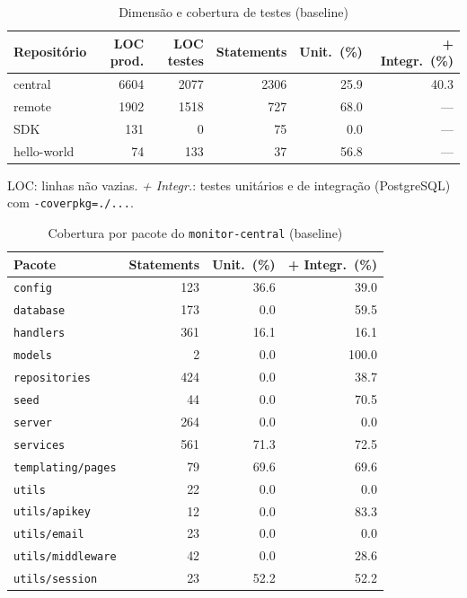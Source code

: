 \begin{table}[htbp]
  \centering\small
  \caption{Dimensão e cobertura de testes (baseline)}
  \label{tab:baseline-cobertura}
  \begin{tabular}{lrrrrr}
    \toprule
    Repositório & LOC prod. & LOC testes & Statements & Unit.\ (\%) & + Integr.\ (\%) \\
    \midrule
    central & 6604 & 2077 & 2306 & 25.9 & 40.3 \\
    remote & 1902 & 1518 & 727 & 68.0 & --- \\
    SDK & 131 & 0 & 75 & 0.0 & --- \\
    hello-world & 74 & 133 & 37 & 56.8 & --- \\
    \bottomrule
  \end{tabular}
  \par\smallskip\footnotesize LOC: linhas não vazias. \emph{+ Integr.}: testes unitários e de integração (PostgreSQL) com \texttt{-coverpkg=./...}.
\end{table}

\begin{table}[htbp]
  \centering\small
  \caption{Cobertura por pacote do \texttt{monitor-central} (baseline)}
  \label{tab:baseline-cobertura-central}
  \begin{tabular}{lrrr}
    \toprule
    Pacote & Statements & Unit.\ (\%) & + Integr.\ (\%) \\
    \midrule
    \texttt{config} & 123 & 36.6 & 39.0 \\
    \texttt{database} & 173 & 0.0 & 59.5 \\
    \texttt{handlers} & 361 & 16.1 & 16.1 \\
    \texttt{models} & 2 & 0.0 & 100.0 \\
    \texttt{repositories} & 424 & 0.0 & 38.7 \\
    \texttt{seed} & 44 & 0.0 & 70.5 \\
    \texttt{server} & 264 & 0.0 & 0.0 \\
    \texttt{services} & 561 & 71.3 & 72.5 \\
    \texttt{templating/pages} & 79 & 69.6 & 69.6 \\
    \texttt{utils} & 22 & 0.0 & 0.0 \\
    \texttt{utils/apikey} & 12 & 0.0 & 83.3 \\
    \texttt{utils/email} & 23 & 0.0 & 0.0 \\
    \texttt{utils/middleware} & 42 & 0.0 & 28.6 \\
    \texttt{utils/session} & 23 & 52.2 & 52.2 \\
    \bottomrule
  \end{tabular}
\end{table}
